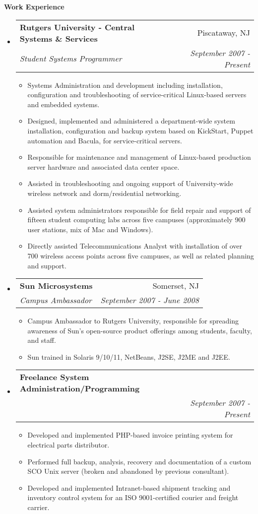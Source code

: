 \documentclass[letterpaper,11pt]{article}
\makeatletter
\newcommand{\resitem}[1]{\item #1 \vspace{-2pt}}
\newcommand{\resheading}[1]{{\large \colorbox{mygrey}{\begin{minipage}{\textwidth}{\textbf{#1 \vphantom{p\^{E}}}}\end{minipage}}}}
\newcommand{\ressubheading}[4]{
\begin{tabular*}{7.0in}{l@{\extracolsep{\fill}}r}
		\textbf{#1} & #2 \\
		\textit{#3} & \textit{#4} \\
\end{tabular*}\vspace{-6pt}}
\makeatother
\begin{document}
\resheading{Work Experience}
\begin{itemize}
\item
	\ressubheading{Rutgers University - Central Systems \& Services}{Piscataway, NJ}{Student Systems Programmer}{September 2007 - Present}
	\begin{itemize}
                \resitem{Systems Administration and development including
                  installation, configuration and troubleshooting of
                  service-critical Linux-based servers and embedded systems.}
                \resitem{Designed, implemented and administered a department-wide system
                  installation, configuration and backup system based on
                  KickStart, Puppet automation and Bacula, for
                  service-critical servers.}
                \resitem{Responsible for maintenance and management of
                  Linux-based production server hardware and associated data center space.}
                \resitem{Assisted in troubleshooting and ongoing support of
                  University-wide wireless network and dorm/residential networking.}
                \resitem{Assisted system administrators responsible for field
                  repair and support of fifteen student computing 
                  labs across five campuses (approximately 900 user stations,
                  mix of Mac and Windows).}
                \resitem{Directly assisted Telecommunications Analyst with
                  installation of over 700 wireless access
                  points across five campuses, as well as related planning and
                  support.}

	\end{itemize}

\item
        \ressubheading{Sun Microsystems}{Somerset, NJ}{Campus Ambassador}{September 2007 - June 2008}
        \begin{itemize}
                \resitem{Campus Ambassador to Rutgers University, responsible
                  for spreading awareness of Sun's open-source product
                  offerings among students, faculty, and staff.}
                \resitem{Sun trained in Solaris 9/10/11,
                  NetBeans, J2SE, J2ME and J2EE. }
        \end{itemize}

\item
        \ressubheading{Freelance System Administration/Programming}{ }{ }{September 2007 - Present}
        \begin{itemize}
               \resitem{Developed and implemented PHP-based invoice printing
                 system for electrical parts distributor.}
               \resitem{Performed full backup, analysis, recovery and documentation of a
                 custom SCO Unix server (broken and abandoned by previous consultant).}
               \resitem{Developed and implemented Intranet-based shipment tracking and
                 inventory control system for an ISO 9001-certified courier
                 and freight carrier.}
        \end{itemize}


\end{itemize}
\end{document}

